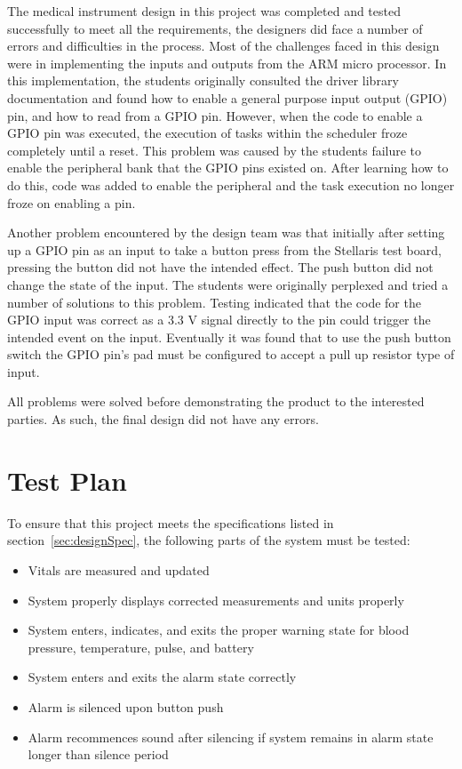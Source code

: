\documentclass[12pt]{article} %
\begin{document}
The medical instrument design in this project was completed and tested successfully to meet all the requirements, the designers did face a number of errors and difficulties in the process. Most of the challenges faced in this design were in implementing the inputs and outputs from the ARM micro processor. In this implementation, the students originally consulted the driver library documentation and found how to enable a general purpose input output (GPIO) pin, and how to read from a GPIO pin. However, when the code to enable a GPIO pin was executed, the execution of tasks within the scheduler froze completely until a reset. This problem was caused by the students failure to enable the peripheral bank that the GPIO pins existed on. After learning how to do this, code was added to enable the peripheral and the task execution no longer froze on enabling a pin.

Another problem encountered by the design team was that initially after setting up a GPIO pin as an input to take a button press from the Stellaris test board, pressing the button did not have the intended effect. The push button did not change the state of the input. The students were originally perplexed and tried a number of solutions to this problem. Testing indicated that the code for the GPIO input was correct as a 3.3 V signal directly to the pin could trigger the intended event on the input. Eventually it was found that to use the push button switch the GPIO pin's pad must be configured to accept a pull up resistor type of input.

All problems were solved before demonstrating the product to the interested parties. As such, the final design did not have any errors.

\section{Test Plan}

To ensure that this project meets the specifications listed in 
section~\ref{sec:designSpec}, the following parts of the system must be 
tested: 

\begin{itemize}
	\item Vitals are measured and updated
	\item System properly displays corrected measurements and units properly
	\item System enters, indicates, and exits the proper warning state for blood pressure, temperature, pulse, and battery
	\item System enters and exits the alarm state correctly
	\item Alarm is silenced upon button push
	\item Alarm recommences sound after silencing if system remains in alarm state longer than silence period
\end{itemize}
\end{document}
